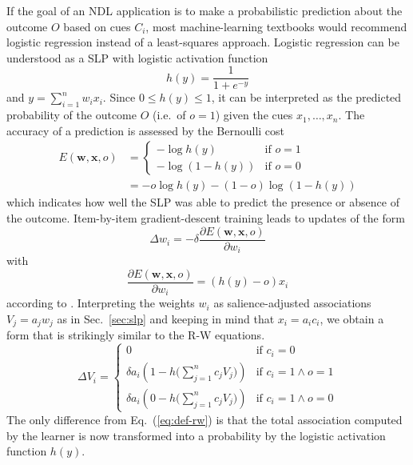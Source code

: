 \documentclass[conference]{IEEEtran}
\begin{document}
If the goal of an NDL application is to make a probabilistic prediction about the outcome $O$ based on cues $C_i$, most machine-learning textbooks would recommend logistic regression \cite[p.\ 205]{bishop2006} instead of a least-squares approach.  Logistic regression can be understood as a SLP with logistic activation function
\begin{equation}
  \label{eq:logistic-function}
  h(y) = \frac{1}{1 + e^{-y}}
\end{equation}
and $y = \sum_{i=1}^n w_i x_i$.  Since $0\leq h(y)\leq 1$, it can be interpreted as the predicted probability of the outcome $O$ (i.e.\ of $o=1$) given the cues $x_1, \ldots, x_n$.  The accuracy of a prediction is assessed by the Bernoulli cost
\begin{equation}
  \label{eq:bernoulli-cost}
  \begin{split}
    E(\mathbf{w}, \mathbf{x}, o) 
    &= \begin{cases}
      -\log h(y) & \text{if } o = 1 \\
      -\log (1 - h(y)) & \text{if } o = 0
    \end{cases}
    \\
    &= - o \log h(y) - (1-o) \log (1 - h(y))
  \end{split}
\end{equation}
which indicates how well the SLP was able to predict the presence or absence of the outcome.  Item-by-item gradient-descent training leads to updates of the form
\begin{equation}
  \label{eq:lrm-gd}
  \Delta w_i = -\delta \frac{\partial E(\mathbf{w}, \mathbf{x}, o)}{\partial w_i}
\end{equation}
with 
\begin{equation}
  \label{eq:lrm-gd-gradient}
  \frac{\partial E(\mathbf{w}, \mathbf{x}, o)}{\partial w_i}
  = (h(y) - o) x_i 
\end{equation}
according to \cite[p.\ 205]{bishop2006}.  Interpreting the weights $w_i$ as salience-adjusted associations $V_j = a_j w_j$ as in Sec.~\ref{sec:slp} and keeping in mind that $x_i = a_i c_i$, we obtain a form that is strikingly similar to the R-W equations.
\begin{equation}
  \label{eq:lrm-rw}
  \Delta V_i =
  \begin{cases}
    0 & \text{if } c_i = 0\\
    \delta a_i \left( 1 - h \bigl( \sum_{j=1}^n c_j V_j \bigr) \right) & \text{if } c_i = 1 \wedge o = 1 \\
    \delta a_i \left( 0 - h \bigl( \sum_{j=1}^n c_j V_j \bigr) \right) & \text{if } c_i = 1 \wedge o = 0
  \end{cases}
\end{equation}
The only difference from Eq.~(\ref{eq:def-rw}) is that the total association computed by the learner is now transformed into a probability by the logistic activation function $h(y)$.
\end{document}
